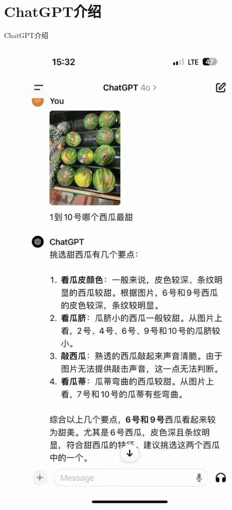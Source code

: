 \documentclass[12pt, aspectration=54, UTF8]{beamer}
\begin{document}
\section{ChatGPT介绍}
\begin{frame}{ChatGPT介绍}
\justifying
    \begin{figure}[htbp]
        \centering
        \begin{minipage}[b]{0.49\linewidth}
            \centering
            \includegraphics[height=0.6\textheight]{Images/1.jpg}

\end{minipage}
\end{figure}
\end{frame}
\end{document}
